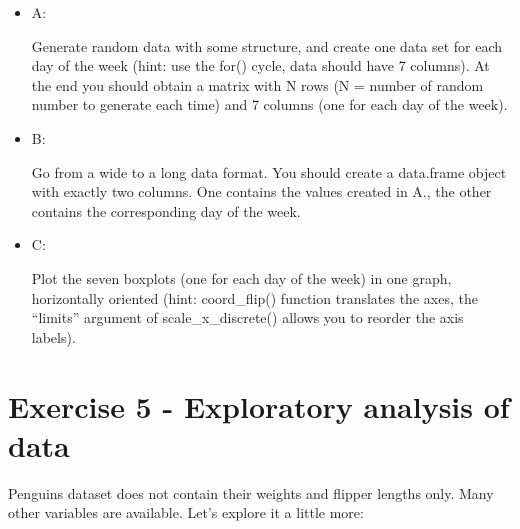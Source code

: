 \documentclass[
]{article}
\begin{document}
\begin{itemize}
\item
  A:

  Generate random data with some structure, and create one data set for
  each day of the week (hint: use the for() cycle, data should have 7
  columns). At the end you should obtain a matrix with N rows (N =
  number of random number to generate each time) and 7 columns (one for
  each day of the week).
\item
  B:

  Go from a wide to a long data format. You should create a data.frame
  object with exactly two columns. One contains the values created in
  A., the other contains the corresponding day of the week.
\item
  C:

  Plot the seven boxplots (one for each day of the week) in one graph,
  horizontally oriented (hint: coord\_flip() function translates the
  axes, the ``limits'' argument of scale\_x\_discrete() allows you to
  reorder the axis labels).
\end{itemize}

\hypertarget{exercise-5---exploratory-analysis-of-data}{%
\section{Exercise 5 - Exploratory analysis of
data}\label{exercise-5---exploratory-analysis-of-data}}

Penguins dataset does not contain their weights and flipper lengths
only. Many other variables are available. Let's explore it a little
more:
\end{document}
